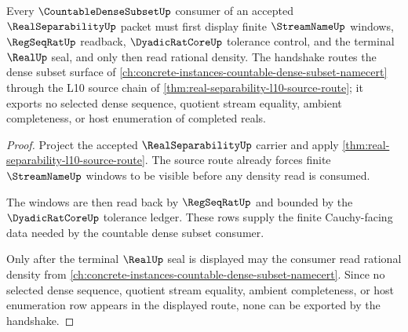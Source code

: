 \begin{theorem}
\label{thm:real-separability-countable-dense-cauchy-handshake}
Every $\CountableDenseSubsetUp$ consumer of an accepted $\RealSeparabilityUp$ packet must first display finite $\StreamNameUp$ windows, $\RegSeqRatUp$ readback, $\DyadicRatCoreUp$ tolerance control, and the terminal $\RealUp$ seal, and only then read rational density. The handshake routes the dense subset surface of \autoref{ch:concrete-instances-countable-dense-subset-namecert} through the L10 source chain of \autoref{thm:real-separability-l10-source-route}; it exports no selected dense sequence, quotient stream equality, ambient completeness, or host enumeration of completed reals.
\end{theorem}
\begin{proof}
Project the accepted $\RealSeparabilityUp$ carrier and apply \autoref{thm:real-separability-l10-source-route}. The source route already forces finite $\StreamNameUp$ windows to be visible before any density read is consumed.

The windows are then read back by $\RegSeqRatUp$ and bounded by the $\DyadicRatCoreUp$ tolerance ledger. These rows supply the finite Cauchy-facing data needed by the countable dense subset consumer.

Only after the terminal $\RealUp$ seal is displayed may the consumer read rational density from \autoref{ch:concrete-instances-countable-dense-subset-namecert}. Since no selected dense sequence, quotient stream equality, ambient completeness, or host enumeration row appears in the displayed route, none can be exported by the handshake.
\end{proof}
